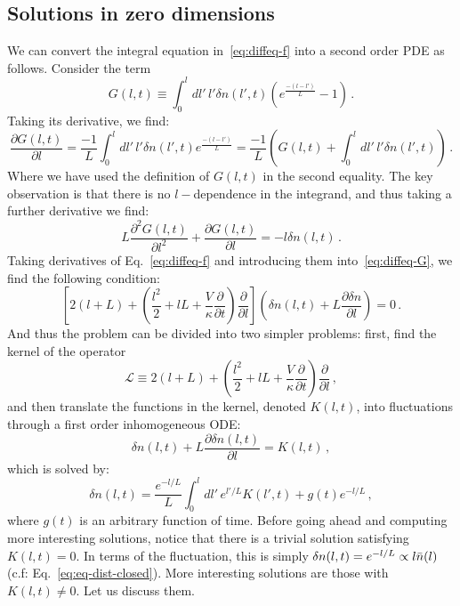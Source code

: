 \documentclass[a4paper,11pt]{article}
\newcommand{\lr}[1]{\left(#1\right)}
\begin{document}
\subsection*{Solutions in zero dimensions}
We can convert the integral equation in~\eqref{eq:diffeq-f} into a second order PDE as follows.
Consider the term
\begin{equation}
    G(l,t)\equiv \int_0^l{dl'\, l'\delta n(l',t)\lr{e^{\frac{-(l-l')}{L}}-1}}\, .
\end{equation}
Taking its derivative, we find:
\begin{equation}
    \frac{\partial G(l,t)}{\partial l}=\frac{-1}{L}\int_0^l{dl'\, l'\delta n(l',t)e^{\frac{-(l-l')}{L}}}=\frac{-1}{L}\lr{G(l,t)+\int_0^l{dl'\, l'\delta n(l',t)}}\, .
\end{equation}
Where we have used the definition of $G(l,t)$ in the second equality.
The key observation is that there is no $l-$dependence in the integrand, and thus taking a further derivative we find:
\begin{equation}\label{eq:diffeq-G}
    L \frac{\partial ^2 G(l,t)}{\partial l^2}+\frac{\partial G(l,t)}{\partial l}=-l\delta n(l,t)\, .
\end{equation}
Taking derivatives of Eq.~\eqref{eq:diffeq-f} and introducing them into~\eqref{eq:diffeq-G}, we find the following condition:
\begin{equation}
    \left[2(l+L)+\lr{\frac{l^2}{2}+l L+\frac{V}{\kappa}\frac{\partial}{\partial t}}\frac{\partial }{\partial l}\right] \lr{\delta n(l,t)+L \frac{\partial \delta n}{\partial l}}=0 \, .
\end{equation}
And thus the problem can be divided into two simpler problems: first, find the kernel of the operator
\begin{equation}
    \mathcal{L}\equiv 2(l+L)+\lr{\frac{l^2}{2}+l L+\frac{V}{\kappa}\frac{\partial}{\partial t}}\frac{\partial }{\partial l} \, ,
\end{equation}
and then translate the functions in the kernel, denoted $K(l,t)$, into fluctuations through a first order inhomogeneous ODE:
\begin{equation}
    \delta n(l,t)+ L \frac{\partial \delta n (l,t)}{\partial l}= K(l,t) \, ,
\end{equation}
which is solved by:
\begin{equation}
\delta n(l,t)= \frac{e^{-l/L}}{L}\int_0^l{dl'\, e^{l'/L}K(l',t)}+g(t)e^{-l/L}\, ,
\end{equation}
where $g(t)$ is an arbitrary function of time.
Before going ahead and computing more interesting solutions, notice that there is a trivial solution satisfying $K(l,t)=0$.
In terms of the fluctuation, this is simply $\delta n(l,t)=e^{-l/L}\propto l\Bar{n}(l)$ (c.f: Eq.~\eqref{eq:eq-dist-closed}).
More interesting solutions are those with $K(l,t)\neq 0$. 
Let us discuss them.
\\ 
\end{document}
